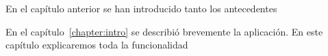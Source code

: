 

En el capítulo anterior se han introducido tanto los antecedentes

En el capítulo~\ref{chapter:intro} se describió brevemente la aplicación. En este capítulo explicaremos toda la funcionalidad 

